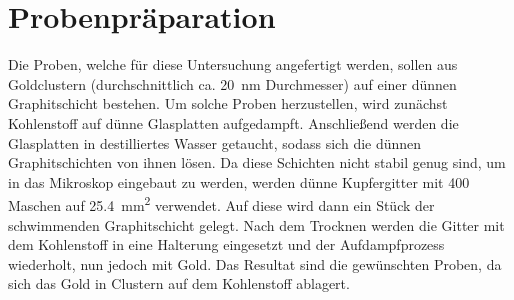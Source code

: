 \clearpage
\section{Probenpräparation}

	Die Proben, welche für diese Untersuchung angefertigt werden, sollen aus Goldclustern (durchschnittlich ca. \SI{20}{\nano\meter} Durchmesser) auf einer dünnen Graphitschicht bestehen.
	Um solche Proben herzustellen, wird zunächst Kohlenstoff auf dünne Glasplatten aufgedampft.
	Anschließend werden die Glasplatten in destilliertes Wasser getaucht, sodass sich die dünnen Graphitschichten von ihnen lösen.
	Da diese Schichten nicht stabil genug sind, um in das Mikroskop eingebaut zu werden, werden dünne Kupfergitter mit 400 Maschen auf \SI{25,4}{\milli\meter\squared} verwendet. %
	Auf diese wird dann ein Stück der schwimmenden Graphitschicht gelegt.
	Nach dem Trocknen werden die Gitter mit dem Kohlenstoff in eine Halterung eingesetzt und der Aufdampfprozess wiederholt, nun jedoch mit Gold.
	Das Resultat sind die gewünschten Proben, da sich das Gold in Clustern auf dem Kohlenstoff ablagert.